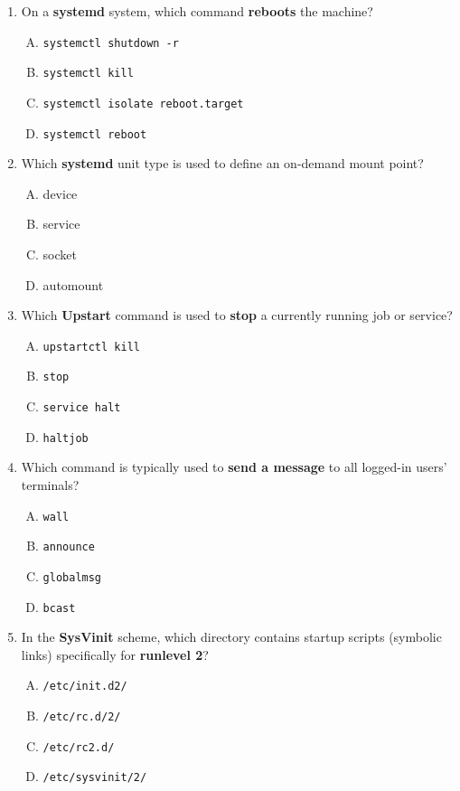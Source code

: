 \documentclass[12pt,a4paper]{report}
\begin{document}
\begin{enumerate}[1.]
    \item On a \textbf{systemd} system, which command \textbf{reboots} the machine?
    \begin{enumerate}[A)]
        \item \texttt{systemctl shutdown -r}
        \item \texttt{systemctl kill}
        \item \texttt{systemctl isolate reboot.target}
        \item \texttt{systemctl reboot}
    \end{enumerate}
    
    \item Which \textbf{systemd} unit type is used to define an on-demand mount point?
    \begin{enumerate}[A)]
        \item device
        \item service
        \item socket
        \item automount
    \end{enumerate}
    
    \item Which \textbf{Upstart} command is used to \textbf{stop} a currently running job or service?
    \begin{enumerate}[A)]
        \item \texttt{upstartctl kill}
        \item \texttt{stop}
        \item \texttt{service halt}
        \item \texttt{haltjob}
    \end{enumerate}
    
    \item Which command is typically used to \textbf{send a message} to all logged-in users’ terminals?
    \begin{enumerate}[A)]
        \item \texttt{wall}
        \item \texttt{announce}
        \item \texttt{globalmsg}
        \item \texttt{bcast}
    \end{enumerate}
    
    \item In the \textbf{SysVinit} scheme, which directory contains startup scripts (symbolic links) specifically for \textbf{runlevel 2}?
    \begin{enumerate}[A)]
        \item \texttt{/etc/init.d2/}
        \item \texttt{/etc/rc.d/2/}
        \item \texttt{/etc/rc2.d/}
        \item \texttt{/etc/sysvinit/2/}
    \end{enumerate}
    
\end{enumerate}
\end{document}
